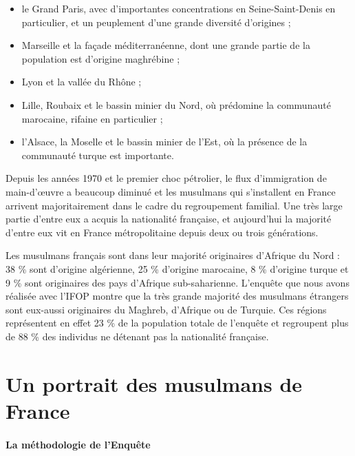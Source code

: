 \begin{itemize}
\item
  
  le Grand Paris, avec d'importantes concentrations en Seine-Saint-Denis
  en particulier, et un peuplement d'une grande diversité d'origines ;
  
\item
  
  Marseille et la façade méditerranéenne, dont une grande partie de la
  population est d'origine maghrébine ;
  
\item
  
  Lyon et la vallée du Rhône ;
  
\item
  
  Lille, Roubaix et le bassin minier du Nord, où prédomine la communauté
  marocaine, rifaine en particulier ;
  
\item
  
  l'Alsace, la Moselle et le bassin minier de l'Est, où la présence de
  la communauté turque est importante.
  
\end{itemize}


Depuis les années 1970 et le premier choc pétrolier, le flux
d'immigration de main-d'œuvre a beaucoup diminué et les musulmans qui
s'installent en France arrivent majoritairement dans le cadre du
regroupement familial. Une très large partie d'entre eux a acquis la
nationalité française, et aujourd'hui la majorité d'entre eux vit en
France métropolitaine depuis deux ou trois générations.

Les musulmans français sont dans leur majorité originaires d'Afrique du
Nord : 38 \% sont d'origine algérienne, 25 \% d'origine marocaine, 8 \%
d'origine turque et 9 \% sont originaires des pays d'Afrique
sub-saharienne. L'enquête que nous avons réalisée avec l'IFOP montre que
la très grande majorité des musulmans étrangers sont eux-aussi
originaires du Maghreb, d'Afrique ou de Turquie. Ces régions
représentent en effet 23 \% de la population totale de l'enquête et
regroupent plus de 88 \% des individus ne détenant pas la nationalité
française.

\section{Un portrait des musulmans de France}


\paragraph{La méthodologie de l'Enquête}


